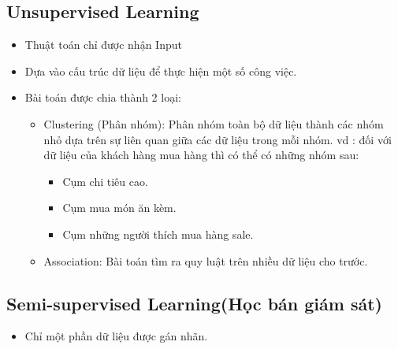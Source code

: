     \subsection{Unsupervised Learning}
    \begin{itemize}
        \item Thuật toán chỉ được nhận Input
        \item Dựa vào cấu trúc dữ liệu để thực hiện một số công việc.
        \item Bài toán được chia thành 2 loại:
        \begin{itemize}
            \item Clustering (Phân nhóm):  Phân nhóm toàn bộ dữ liệu thành các nhóm nhỏ dựa trên sự liên quan giữa các dữ liệu trong mỗi nhóm. vd : đối với dữ liệu của khách hàng mua hàng thì có thể có những nhóm sau:
            \begin{itemize}
                \item Cụm chi tiêu cao.
                \item Cụm mua món ăn kèm.
                \item Cụm những người thích mua hàng sale.
            \end{itemize}
            \item Association: Bài toán tìm ra quy luật trên nhiều dữ liệu cho trước.
         \end{itemize}
    \end{itemize}
    \subsection{Semi-supervised Learning(Học bán giám sát)}
    \begin{itemize}
        \item Chỉ một phần dữ liệu được gán nhãn.
    \end{itemize}
